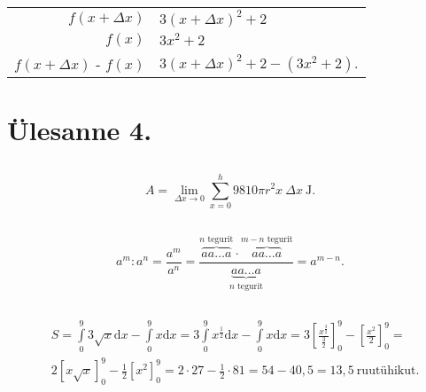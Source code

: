 \documentclass[a4paper,fleqn,12pt]{article}
\theoremstyle{definition}
\begin{document}
\begin{center}
  \begin{tabular}{ r @{ $=$ } l }
					   $f(x+\Delta x)$ & $3(x + \Delta x)^2 + 2$ \\
					            $f(x)$ & $3x^2  + 2$ \\
    \hline
    $f(x+\Delta x)$ - $f(x)$ & $3(x + \Delta x)^2 + 2 - (3x^2  + 2)$.
  \end{tabular}
\end{center}
\newcommand{\cOut}[2]{
\stackrel{\textstyle #2}{\cancel{#1}}
}

\newcommand{\cOutB}[2]{
\underset{\textstyle #2}{\cancel{#1}}
}

\section{Ülesanne 4.}

\subsection*{}

\begin{displaymath}
  A = \lim_{\Delta x \to 0} \sum_{x=0}^{h} 9810 \pi r^2 x \: \Delta x \: \mathrm{J}.
\end{displaymath}

\subsection*{}

\begin{displaymath}
  a^m : a^n =
  \frac{a^m}{a^n} =
  \frac{\overbrace{aa \dots a}^\text{$n$ tegurit} \cdot \overbrace{aa \dots a}^\text{$m-n$ tegurit}}
  {\underbrace{aa \dots a}_\text{$n$ tegurit}} =
  a^{m-n}.
\end{displaymath}

\subsection*{}

\begin{displaymath}
  \begin{split}
    & S = \int\limits_0^9 3\sqrt{x} \mathrm{d}x - \int\limits_0^9 x \mathrm{d}x =
    3 \int\limits_0^9 x^{\frac{1}{2}} \mathrm{d}x - \int\limits_0^9 x \mathrm{d}x =
    3\left[\frac{x^{\frac{3}{2}}}{\frac{3}{2}}\right]_0^9 - \left[\frac{x^2}{2}\right]_0^9 = \\
    & 2[x \sqrt{x}]_0^9 - \frac{1}{2} [x^2]_0^9 =
    2 \cdot 27 - \frac{1}{2} \cdot 81 = 54 - 40,5 = 13,5 \: \text{ruutühikut}.
  \end{split}
\end{displaymath}
\end{document}
